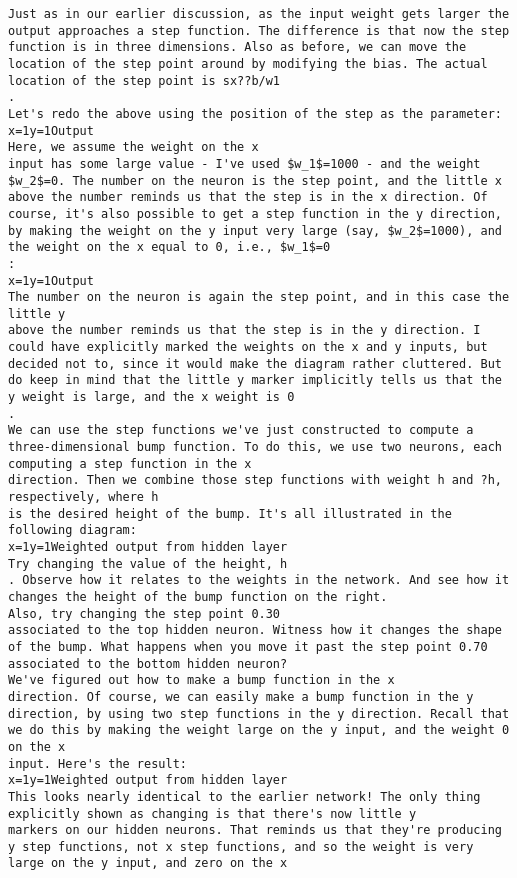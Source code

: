 \begin{lstlisting}
Just as in our earlier discussion, as the input weight gets larger the output approaches a step function. The difference is that now the step function is in three dimensions. Also as before, we can move the location of the step point around by modifying the bias. The actual location of the step point is sx??b/w1
.
Let's redo the above using the position of the step as the parameter:
x=1y=1Output
Here, we assume the weight on the x
input has some large value - I've used $w_1$=1000 - and the weight $w_2$=0. The number on the neuron is the step point, and the little x above the number reminds us that the step is in the x direction. Of course, it's also possible to get a step function in the y direction, by making the weight on the y input very large (say, $w_2$=1000), and the weight on the x equal to 0, i.e., $w_1$=0
:
x=1y=1Output
The number on the neuron is again the step point, and in this case the little y
above the number reminds us that the step is in the y direction. I could have explicitly marked the weights on the x and y inputs, but decided not to, since it would make the diagram rather cluttered. But do keep in mind that the little y marker implicitly tells us that the y weight is large, and the x weight is 0
.
We can use the step functions we've just constructed to compute a three-dimensional bump function. To do this, we use two neurons, each computing a step function in the x
direction. Then we combine those step functions with weight h and ?h, respectively, where h
is the desired height of the bump. It's all illustrated in the following diagram:
x=1y=1Weighted output from hidden layer
Try changing the value of the height, h
. Observe how it relates to the weights in the network. And see how it changes the height of the bump function on the right.
Also, try changing the step point 0.30
associated to the top hidden neuron. Witness how it changes the shape of the bump. What happens when you move it past the step point 0.70
associated to the bottom hidden neuron?
We've figured out how to make a bump function in the x
direction. Of course, we can easily make a bump function in the y direction, by using two step functions in the y direction. Recall that we do this by making the weight large on the y input, and the weight 0 on the x
input. Here's the result:
x=1y=1Weighted output from hidden layer
This looks nearly identical to the earlier network! The only thing explicitly shown as changing is that there's now little y
markers on our hidden neurons. That reminds us that they're producing y step functions, not x step functions, and so the weight is very large on the y input, and zero on the x

\end{lstlisting}
